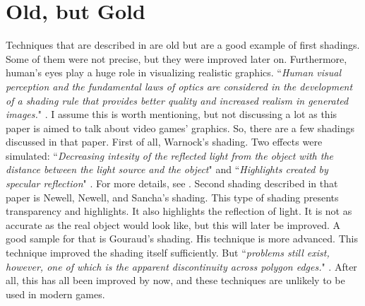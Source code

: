 \documentclass{scrartcl}
\begin{document}
\section{Old, but Gold}
Techniques that are described in \cite{phong1975illumination} are old but are a good example of first shadings.
Some of them were not precise, but they were improved later on.
Furthermore, human's eyes play a huge role in visualizing realistic graphics.
``\textit{Human visual perception and the fundamental laws of optics are considered in the development of a shading rule that provides better quality and increased realism in generated images.}"  \cite[p.~311]{phong1975illumination}.
I assume this is worth mentioning, but not discussing a lot as this paper is aimed to talk about video games' graphics.
So, there are a few shadings discussed in that paper.
First of all, Warnock's shading.
Two effects were simulated: ``\textit{Decreasing intesity of the reflected light from the object with the distance between the light source and the object}" \cite[p.~313]{phong1975illumination}
and ``\textit{Highlights created by specular reflection}" \cite[p.~313]{phong1975illumination}. 
For more details, see \cite{phong1975illumination}.
Second shading described in that paper is Newell, Newell, and Sancha's shading.
This type of shading presents transparency and highlights.
It also highlights the reflection of light.
It is not as accurate as the real object would look like, but this will later be improved.
A good sample for that is Gouraud's shading.
His technique is more advanced.
This technique improved the shading itself sufficiently.
But ``\textit{problems still exist, however, one of which is the apparent discontinuity across polygon edges.}" \cite[p.~314]{phong1975illumination}.
After all, this has all been improved by now, and these techniques are unlikely to be used in modern games.
\end{document}
